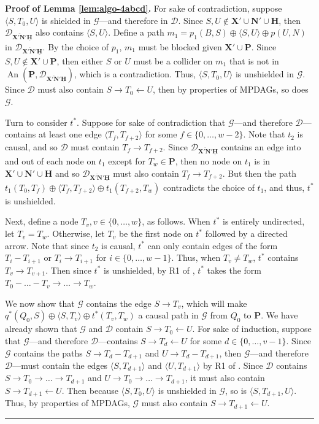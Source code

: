 \documentclass[11pt]{article}
\DeclareMathOperator{\An}{An}
\newcommand{\BlackBox}{\rule{1.5ex}{1.5ex}}  %
\newcommand{\mb}[1]{\mathbf{#1}}
\newcommand{\g}[1][G]{\mathcal{#1}}
\newenvironment{proofof}[1][]{\noindent \textbf{Proof of #1.}}{\hfill\BlackBox}
\begin{document}
\begin{proofof}[Lemma \ref{lem:algo-4abcd}]
    For sake of contradiction, suppose $\langle S, T_0, U \rangle$ is shielded in $\g$---and therefore in $\g[D]$. Since $S,U \notin \mb{X'} \cup \mb{N'} \cup \mb{H}$, then $\g[D]_{\overline{\mb{X'}\mb{N'}}\underline{\mb{H}}}$ also contains $\langle S,U \rangle$. Define a path $m_1 = p_1(B, S) \oplus \langle S, U \rangle \oplus p(U, N)$ in $\g[D]_{\overline{\mb{X'}\mb{N'}}\underline{\mb{H}}}$. By the choice of $p_1$, $m_1$ must be blocked given $\mb{X'} \cup \mb{P}$. Since $S, U \notin \mb{X'} \cup \mb{P}$, then either $S$ or $U$ must be a collider on $m_1$ that is not in $\An(\mb{P}, \g[D]_{\overline{\mb{X'}\mb{N'}}\underline{\mb{H}}})$, which is a contradiction. Thus, $\langle S, T_0, U \rangle$ is unshielded in $\g$. Since $\g[D]$ must also contain $S \to T_0 \gets U$, then by properties of MPDAGs, so does $\g$.

    Turn to consider $t^*$. Suppose for sake of contradiction that $\g$---and therefore $\g[D]$---contains at least one edge $\langle T_f, T_{f+2} \rangle$ for some $f \in \{0, \dots, w-2 \}$. Note that $t_2$ is causal, and so $\g[D]$ must contain $T_f \to T_{f+2}$. Since $\g[D]_{\overline{\mb{X'}\mb{N'}}\underline{\mb{H}}}$ contains an edge into and out of each node on $t_1$ except for $T_w \in \mb{P}$, then no node on $t_1$ is in $\mb{X'} \cup \mb{N'} \cup \mb{H}$ and so $\g[D]_{\overline{\mb{X'}\mb{N'}}\underline{\mb{H}}}$ must also contain $T_f \to T_{f+2}$. But then the path $t_1(T_0, T_f) \oplus \langle T_f, T_{f+2} \rangle \oplus t_1(T_{f+2}, T_w)$ contradicts the choice of $t_1$, and thus, $t^*$ is unshielded. 

    Next, define a node $T_v, v \in \{0, \dots, w\}$, as follows. When $t^*$ is entirely undirected, let $T_v = T_w$. Otherwise, let $T_v$ be the first node on $t^*$ followed by a directed arrow. Note that since $t_2$ is causal, $t^*$ can only contain edges of the form $T_i - T_{i+1}$ or $T_i \to T_{i+1}$ for $i \in \{0, \dots, w-1\}$. Thus, when $T_v \neq T_w$, $t^*$ contains $T_v \to T_{v+1}$. Then since $t^*$ is unshielded, by R1 of \cite{meek1995causal}, $t^*$ takes the form $T_0 - \dots - T_v \to \dots \to T_w$.

    We now show that $\g$ contains the edge $S \to T_v$, which will make $q^*(Q_0,S) \oplus \langle S, T_v\rangle \oplus t^*(T_v,T_w)$ a causal path in $\g$ from $Q_0$ to $\mb{P}$. We have already shown that $\g$ and $\g[D]$ contain $S \to T_0 \gets U$. For sake of induction, suppose that $\g$---and therefore $\g[D]$---contains $S \to T_d \gets U$ for some $d \in \{0, \dots, v-1\}$. Since $\g$ contains the paths $S \to T_d - T_{d+1}$ and $U \to T_d - T_{d+1}$, then $\g$---and therefore $\g[D]$---must contain the edges $\langle S, T_{d+1} \rangle$ and $\langle U,T_{d+1} \rangle$ by R1 of \cite{meek1995causal}. Since $\g[D]$ contains $S \to T_0 \to \dots \to T_{d+1}$ and $U \to T_0 \to \dots \to T_{d+1}$, it must also contain $S \to T_{d+1} \gets U$. Then because $\langle S, T_0, U \rangle$ is unshielded in $\g$, so is $\langle S, T_{d+1}, U \rangle$. Thus, by properties of MPDAGs, $\g$ must also contain $S \to T_{d+1} \gets U$.
\end{proofof}
\end{document}
